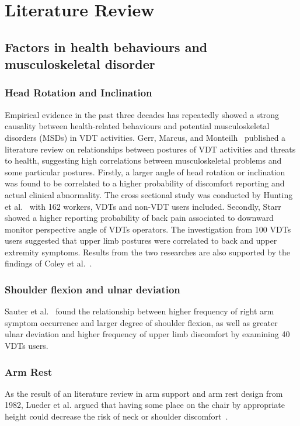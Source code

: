 \chapter{Literature Review}

\section{Factors in health behaviours and musculoskeletal disorder}

\subsection{Head Rotation and Inclination}
Empirical evidence in the past three decades has repeatedly showed a strong causality between health-related behaviours and potential musculoskeletal disorders (MSDs) in VDT activities. Gerr, Marcus, and Monteilh~\cite{epid_musculo_disorder} published a literature review on relationships between postures of VDT activities and threats to health, suggesting high correlations between musculoskeletal problems and some particular postures. Firstly, a larger angle of head rotation or inclination was found to be correlated to a higher probability of discomfort reporting and actual clinical abnormality. The cross sectional study was conducted by Hunting et al.~\cite{constrained_postures_vdt} with 162 workers, VDTs and non-VDT users included. Secondly, Starr~\cite{posture_discomfort_vdt} showed a higher reporting probability of back pain associated to downward monitor perspective angle of VDTs operators. The investigation from 100 VDTs users suggested that upper limb postures were correlated to back and upper extremity symptoms. Results from the two researches are also supported by the findings of Coley et al.~\cite{arm_daily_activity}.

\subsection{Shoulder flexion and ulnar deviation}
Sauter et al.~\cite{work_posture_musculo_discomfort} found the relationship between higher frequency of right arm symptom occurrence and larger degree of shoulder flexion, as well as greater ulnar deviation and higher frequency of upper limb discomfort by examining 40 VDTs users.

\subsection{Arm Rest}
As the result of an literature review in arm support and arm rest design from 1982, Lueder et al. argued that having some place on the chair by appropriate height could decrease the risk of neck or shoulder discomfort~\cite{armrest_design_use}.

